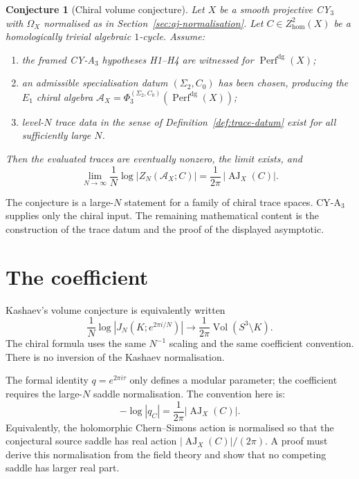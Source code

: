 \documentclass[11pt]{article}
\newtheorem{conjecture}[theorem]{Conjecture}
\newcommand{\cA}{\mathcal{A}}
\newcommand{\AJ}{\operatorname{AJ}}
\begin{document}
\begin{conjecture}[Chiral volume conjecture]
\label{conj:chiral-volume}
Let $X$ be a smooth projective CY$_3$ with $\Omega_X$ normalised as in
Section~\ref{sec:aj-normalisation}. Let
$C\in Z^2_{\mathrm{hom}}(X)$ be a homologically trivial algebraic
$1$-cycle. Assume:
\begin{enumerate}[label=\textup{(A\arabic*)}]
\item the framed CY-A$_3$ hypotheses H1--H4 are witnessed for
  $\operatorname{Perf}^{\mathrm{dg}}(X)$;
\item an admissible specialisation datum $(\Sigma_2,C_0)$ has been
  chosen, producing the $E_1$ chiral algebra
  $\cA_X=\Phi_3^{(\Sigma_2,C_0)}(\operatorname{Perf}^{\mathrm{dg}}(X))$;
\item level-$N$ trace data in the sense of
  Definition~\ref{def:trace-datum} exist for all sufficiently large $N$.
\end{enumerate}
Then the evaluated traces are eventually nonzero, the limit exists, and
\[
  \lim_{N\to\infty}\frac{1}{N}
  \log\bigl|Z_N(\cA_X;C)\bigr|
  =
  \frac{1}{2\pi}\,|\AJ_X(C)|.
\]
\end{conjecture}

The conjecture is a large-$N$ statement for a family of chiral trace
spaces. CY-A$_3$ supplies only the chiral input. The remaining
mathematical content is the construction of the trace datum and the
proof of the displayed asymptotic.

\section{The coefficient}
\label{sec:coefficient}

Kashaev's volume conjecture is equivalently written
\[
  \frac{1}{N}\log |J_N(K;e^{2\pi i/N})|
  \longrightarrow
  \frac{1}{2\pi}\operatorname{Vol}(S^3\setminus K).
\]
The chiral formula uses the same $N^{-1}$ scaling and the same
coefficient convention. There is no inversion of the Kashaev
normalisation.

The formal identity \(q=e^{2\pi i\tau}\) only defines a modular
parameter; the coefficient requires the large-\(N\) saddle
normalisation. The convention here is:
\[
  -\log |q_C|
  =
  \frac{1}{2\pi}|\AJ_X(C)|.
\]
Equivalently, the holomorphic Chern--Simons action is normalised so
that the conjectural source saddle has real action
$|\AJ_X(C)|/(2\pi)$. A proof must derive this normalisation from the
field theory and show that no competing saddle has larger real part.
\end{document}
